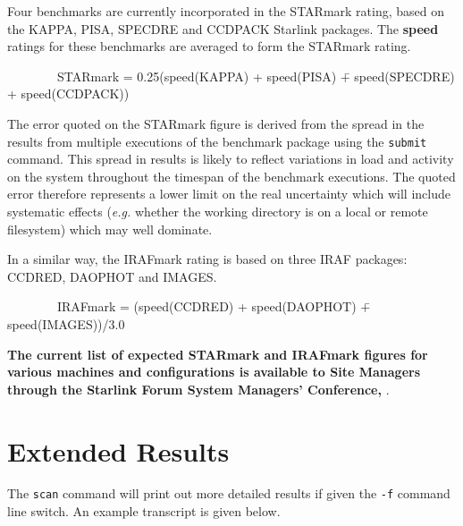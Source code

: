 Four benchmarks are currently incorporated in the STARmark rating,
based on the KAPPA, PISA, SPECDRE and CCDPACK Starlink packages. The
{\bf speed} ratings for these benchmarks are averaged to form the
STARmark rating.

\begin{tabbing}
~~~~~~~~STARmark = 0.25(speed(KAPPA) + speed(PISA) \=+ speed(SPECDRE)  \\
                                                     \>+ speed(CCDPACK))
\end{tabbing}

The error quoted on the STARmark figure is derived from the spread in
the results from multiple executions of the benchmark package using the
{\tt submit} command.  This spread in results is likely to reflect
variations in load and activity on the system throughout the timespan
of the benchmark executions. The quoted error therefore represents a
lower limit on the real uncertainty which will include systematic
effects ({\em e.g.} whether the working directory is on a local or
remote filesystem) which may well dominate.

In a similar way, the IRAFmark rating is based on three IRAF
packages: CCDRED, DAOPHOT and IMAGES.

\begin{tabbing}
~~~~~~~~IRAFmark = (speed(CCDRED) + speed(DAOPHOT) \=+ speed(IMAGES))/3.0  \\
\end{tabbing}


{\bf The current list of expected STARmark and IRAFmark figures for various
machines and configurations is available to Site Managers through the
Starlink Forum System Managers' Conference, }.


\section{Extended Results}
\label{results}

The {\tt scan} command will print out more detailed results if given
the {\tt -f} command line switch. An example transcript is given below.


